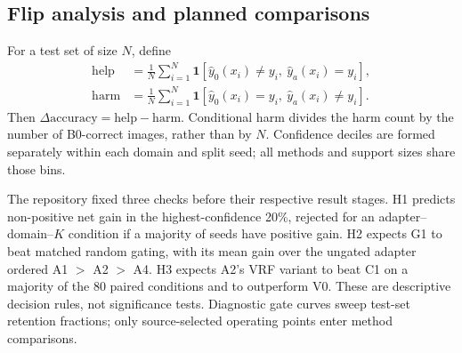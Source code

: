 \subsection{Flip analysis and planned comparisons}
For a test set of size $N$, define
\begin{align}
 \mathrm{help} &= \frac{1}{N}\sum_{i=1}^{N}
   \mathbf{1}[\hat y_0(x_i)\ne y_i,\ \hat y_a(x_i)=y_i],\\
 \mathrm{harm} &= \frac{1}{N}\sum_{i=1}^{N}
   \mathbf{1}[\hat y_0(x_i)=y_i,\ \hat y_a(x_i)\ne y_i].
\end{align}
Then $\Delta\mathrm{accuracy}=\mathrm{help}-\mathrm{harm}$. Conditional harm divides the harm count by the number of B0-correct images, rather than by $N$. Confidence deciles are formed separately within each domain and split seed; all methods and support sizes share those bins.

The repository fixed three checks before their respective result stages. H1 predicts non-positive net gain in the highest-confidence 20\%, rejected for an adapter--domain--$K$ condition if a majority of seeds have positive gain. H2 expects G1 to beat matched random gating, with its mean gain over the ungated adapter ordered A1 $>$ A2 $>$ A4. H3 expects A2's VRF variant to beat C1 on a majority of the 80 paired conditions and to outperform V0. These are descriptive decision rules, not significance tests. Diagnostic gate curves sweep test-set retention fractions; only source-selected operating points enter method comparisons.
